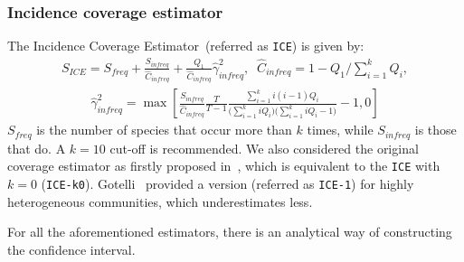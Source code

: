 \documentclass[sigconf,review,anonymous]{acmart}
\newcommand{\ICEallrare}{ICE-k0\xspace}
\newcounter{todocounter}
\newcommand{\todo}[1]{\marginpar{$|$}\textcolor{red}{\stepcounter{todocounter}\footnote[\thetodocounter]{\textcolor{red}{\textbf{TODO }}\textit{#1}}}}
\def\<#1>{\texttt{#1}}
\renewcommand{\todo}[1]{}
\begin{document}
\subsubsection{Incidence coverage estimator~\cite{chao1992estimating}} %
The Incidence Coverage Estimator~(referred as \<ICE>) %
is given by:
\begin{gather*}
  S_{\textit{ICE}} = S_{\textit{freq}} + \frac{S_{\textit{infreq}}}{\hat{C}_{\textit{infreq}}}
  + \frac{Q_1}{\hat{C}_{\textit{infreq}}}\hat{\gamma}^2_{\textit{infreq}},\;\; \hat{C}_{\textit{infreq}}=1-Q_{1}/\sum_{i=1}^{k}Q_{i},
\end{gather*}
\begin{gather*}
  \hat{\gamma}_{\textit{infreq}}^2 = \max\left[\frac{S_{\textit{infreq}}}{\hat{C}_{\textit{infreq}}}\frac{T}{T-1}
  \frac{\sum_{i=1}^{k} i(i-1)Q_i}{
    \big(\sum_{i=1}^{k} iQ_i\big) \big(\sum_{i=1}^{k} iQ_i-1\big)
  } -1,0
  \right]
\end{gather*}
$S_{\textit{freq}}$ is the number of species that occur more than $k$ times, %
while $S_{\textit{infreq}}$ is those that do. %
A $k=10$ cut-off is recommended. We also considered the original coverage estimator
as firstly proposed in~\cite{lee1994estimating}, which is equivalent to the
\<ICE> with $k=0$ (\<\ICEallrare>).
%
Gotelli~\cite{gotelli2013measuring} provided a version (referred as \<ICE-1>) for highly heterogeneous communities,
which underestimates less. %


For all the aforementioned estimators, there is an analytical way of constructing the confidence interval.



\end{document}
